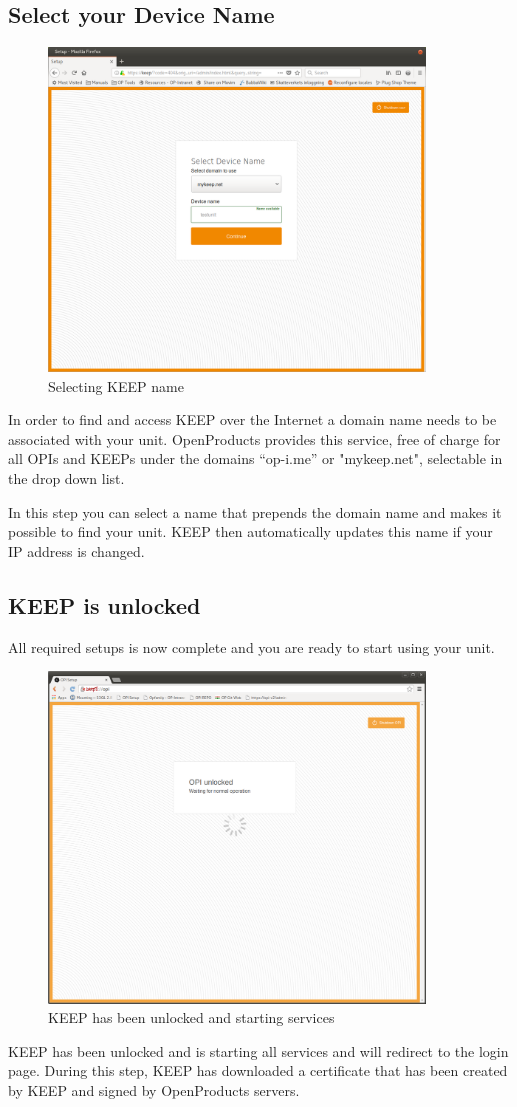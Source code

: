 \documentclass[12pt,a4paper,titlepage]{article}
\begin{document}
\newpage
\subsection{Select your Device Name}
\begin{figure}[h!]
\centering
\includegraphics[width=10cm]{./img/opiname}
\caption{Selecting KEEP name}
\end{figure}
In order to find and access KEEP over the Internet a domain name needs to be associated with your unit. OpenProducts provides this service, free of charge for all OPIs and KEEPs under the domains “op-i.me” or "mykeep.net", selectable in the drop down list.

In this step you can select a name that prepends the domain name and makes it possible to find your unit. KEEP then automatically updates this name if your IP address is changed.

\newpage
\subsection{KEEP is unlocked}
All required setups is now complete and you are ready to start using your unit.
\begin{figure}[h!]
\centering
\includegraphics[width=10cm]{./img/unlocked}
\caption{KEEP has been unlocked and starting services}
\end{figure}
KEEP has been unlocked and is starting all services and will redirect to the login page.
During this step, KEEP has downloaded a certificate that has been created by KEEP and signed by OpenProducts servers.
\end{document}
